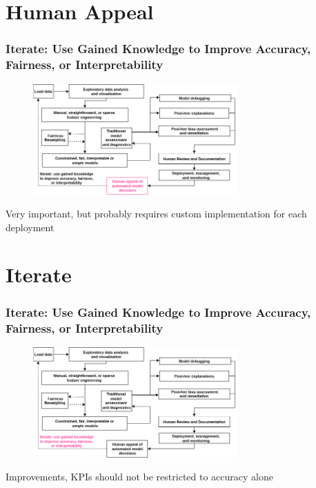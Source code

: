 \documentclass[11pt,
               aspectratio=169,
               hyperref={colorlinks}
               ]{beamer}
\begin{document}
	\section{Human Appeal}

		\begin{frame}	
			\frametitle{Iterate: Use Gained Knowledge to Improve Accuracy, Fairness, or Interpretability}		
			
			\begin{figure}[htb]
				\begin{center}
					\includegraphics[height=120pt]{img/ha.png}
					\label{fig:blueprint}
				\end{center}
			\end{figure}	

			\centering
Very important, but probably requires custom implementation for each deployment

		\end{frame}

	\section{Iterate}

		\begin{frame}	

			\frametitle{Iterate: Use Gained Knowledge to Improve Accuracy, Fairness, or Interpretability}		
			
			\begin{figure}[htb]
				\begin{center}
					\includegraphics[height=120pt]{img/iter.png}
					\label{fig:blueprint}
				\end{center}
			\end{figure}	

			\centering
			Improvements, KPIs should not be restricted to accuracy alone
		
		\end{frame}
\end{document}
